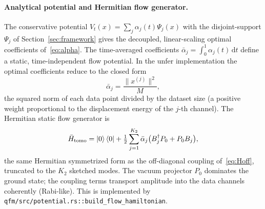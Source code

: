 \documentclass[11pt, a4paper]{article}
\begin{document}
\paragraph{Analytical potential and Hermitian flow generator.} The
conservative potential $V_t(x)=\sum_j\alpha_j(t)\Psi_j(x)$ with the
disjoint-support $\Psi_j$ of Section~\ref{sec:framework} gives the
decoupled, linear-scaling optimal coefficients of~\eqref{eq:alpha}. The
time-averaged coefficients $\bar\alpha_j=\int_0^1\alpha_j(t)\,\mathrm{d}t$
define a static, time-independent flow potential. In the unfer
implementation the optimal coefficients reduce to the closed form
\begin{equation}
  \bar\alpha_j=\frac{\|x^{(j)}\|^2}{M},
\end{equation}
the squared norm of each data point divided by the dataset size (a positive
weight proportional to the displacement energy of the $j$-th channel). The
Hermitian static flow generator is
\begin{equation}
  \bar H_{\mathrm{tomo}}=\ket{0}\bra{0}+\tfrac12\sum_{j=1}^{K_2}
  \bar\alpha_j\bigl(B^\dagger_{j}P_0+P_0 B_j\bigr),
  \label{eq:Htomo}
\end{equation}
the same Hermitian symmetrized form as the off-diagonal coupling
of~\eqref{eq:Hoff}, truncated to the $K_2$ sketched modes. The vacuum
projector $P_0$ dominates the ground state; the coupling terms transport
amplitude into the data channels coherently (Rabi-like). This is implemented
by \texttt{qfm/src/potential.rs::build\_flow\_hamiltonian}.
\end{document}
